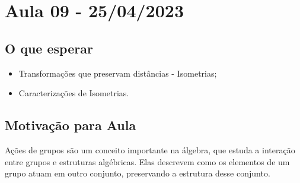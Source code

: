 \documentclass[algebra_notes.tex]{subfiles}
\begin{document}
\section{Aula 09 - 25/04/2023}
\subsection{O que esperar}
\begin{itemize}
	\item Transformações que preservam distâncias - Isometrias;
	\item Caracterizações de Isometrias.
\end{itemize}

\subsection{Motivação para Aula}
Ações de grupos são um conceito importante na álgebra, que estuda a interação entre grupos e estruturas algébricas.
Elas descrevem como os elementos de um grupo atuam em outro conjunto, preservando a estrutura desse conjunto.
\end{document}
